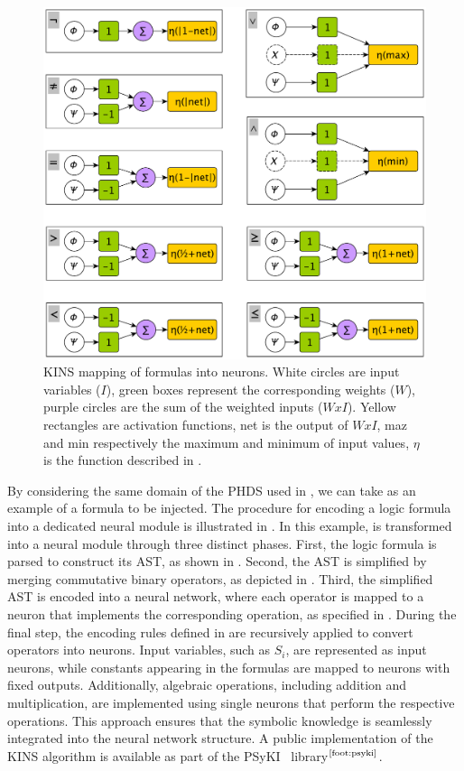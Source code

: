 
%
\begin{figure}
    \centering
    \includegraphics[width=0.8\linewidth]{figures/neurons}
    \caption[KINS mapping of formulas into neurons]{
        \gls{KINS} mapping of formulas into neurons.
        White circles are input variables ($I$), green boxes represent the corresponding weights ($W$), purple circles are the sum of the weighted inputs ($W x I$).
        Yellow rectangles are activation functions, net is the output of $W x I$, maz and min respectively the maximum and minimum of input values, $\eta$ is the function described in .
    }
    \label{fig:kins-neurons-mapping}
\end{figure}
%
By considering the same domain of the \gls{PHDS} used in , we can take  as an example of a formula to be injected.
%
The procedure for encoding a logic formula into a dedicated neural module is illustrated in .
%
In this example,  is transformed into a neural module through three distinct phases.
%
First, the logic formula is parsed to construct its \gls{AST}, as shown in .
%
Second, the \gls{AST} is simplified by merging commutative binary operators, as depicted in .
%
Third, the simplified \gls{AST} is encoded into a neural network, where each operator is mapped to a neuron that implements the corresponding operation, as specified in .
%
During the final step, the encoding rules defined in  are recursively applied to convert operators into neurons.
%
Input variables, such as \(S_i\), are represented as input neurons, while constants appearing in the formulas are mapped to neurons with fixed outputs.
%
Additionally, algebraic operations, including addition and multiplication, are implemented using single neurons that perform the respective operations.
%
This approach ensures that the symbolic knowledge is seamlessly integrated into the neural network structure.
%
A public implementation of the \gls{KINS} algorithm is available as part of the \gls{PSyKI}~\cite{DBLP:conf/atal/MagniniCO22} library$^\text{\ref{foot:psyki}}$.


